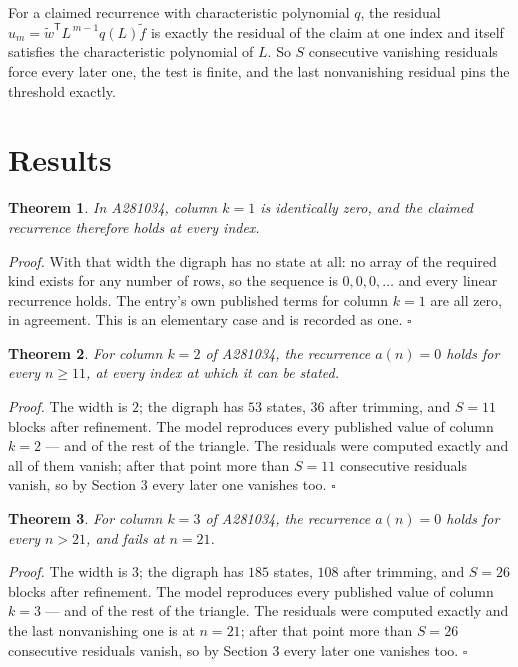 \documentclass[11pt]{article}
\newtheorem{theorem}{Theorem}
\theoremstyle{definition}
\begin{document}
For a claimed recurrence with characteristic polynomial $q$, the residual $u_m = \tilde w^{\mathsf T}L^{\,m-1}q(L)\tilde f$ is exactly the residual of the claim at one index and itself satisfies the characteristic polynomial of $L$. So $S$ consecutive vanishing residuals force every later one, the test is finite, and the last nonvanishing residual pins the threshold exactly.

\section{Results}

\begin{theorem} In A281034, column $k = 1$ is identically zero, and the claimed recurrence therefore holds at every index.\end{theorem}

{\itshape Proof.} With that width the digraph has no state at all: no array of the required kind exists for any number of rows, so the sequence is $0,0,0,\dots$ and every linear recurrence holds. The entry's own published terms for column $k = 1$ are all zero, in agreement. This is an elementary case and is recorded as one. $\square$

\begin{theorem} For column $k = 2$ of A281034, the recurrence $a(n) = 0$ holds for every $n \ge 11$, at every index at which it can be stated.\end{theorem}

{\itshape Proof.} The width is $2$; the digraph has $53$ states, $36$ after trimming, and $S = 11$ blocks after refinement. The model reproduces every published value of column $k = 2$ --- and of the rest of the triangle. The residuals were computed exactly and all of them vanish; after that point more than $S = 11$ consecutive residuals vanish, so by Section 3 every later one vanishes too. $\square$

\begin{theorem} For column $k = 3$ of A281034, the recurrence $a(n) = 0$ holds for every $n > 21$, and fails at $n = 21$.\end{theorem}

{\itshape Proof.} The width is $3$; the digraph has $185$ states, $108$ after trimming, and $S = 26$ blocks after refinement. The model reproduces every published value of column $k = 3$ --- and of the rest of the triangle. The residuals were computed exactly and the last nonvanishing one is at $n = 21$; after that point more than $S = 26$ consecutive residuals vanish, so by Section 3 every later one vanishes too. $\square$
\end{document}
